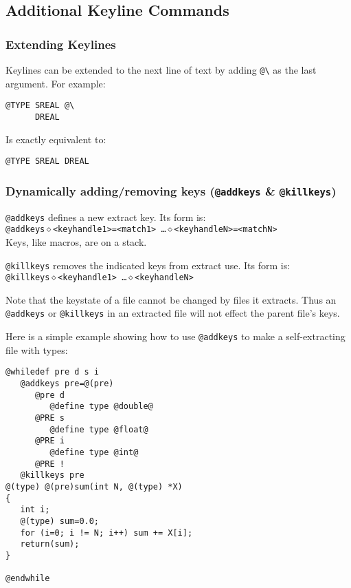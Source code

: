 \subsection{Additional Keyline Commands}
\label{sec-keylines}

\subsubsection{Extending Keylines}

Keylines can be extended to the next line of text by adding \verb+@\+ as the
last argument.  For example:
\begin{verbatim}
@TYPE SREAL @\
      DREAL
\end{verbatim}

Is exactly equivalent to:
\begin{verbatim}
@TYPE SREAL DREAL
\end{verbatim}

\subsubsection{Dynamically adding/removing keys ({\tt @addkeys} \& {\tt @killkeys})}
{\tt @addkeys} defines a new extract key.  Its form is:\\
{\tt @addkeys$\diamond$<keyhandle1>=<match1> \ldots $\diamond$<keyhandleN>=<matchN>}\\
Keys, like macros, are on a stack.

{\tt @killkeys} removes the indicated keys from extract use.  Its form is:\\
{\tt @killkeys$\diamond$<keyhandle1> \ldots $\diamond$<keyhandleN>}

Note that the keystate of a file cannot be changed by files it extracts.  Thus
an {\tt @addkeys} or {\tt @killkeys} in an extracted file will not effect the
parent file's keys.

\noindent
Here is a simple example showing how to use {\tt @addkeys} to make a
self-extracting file with types:
\begin{verbatim}
@whiledef pre d s i
   @addkeys pre=@(pre)
      @pre d
         @define type @double@
      @PRE s
         @define type @float@
      @PRE i
         @define type @int@
      @PRE !
   @killkeys pre
@(type) @(pre)sum(int N, @(type) *X)
{
   int i;
   @(type) sum=0.0;
   for (i=0; i != N; i++) sum += X[i];
   return(sum);
}

@endwhile
\end{verbatim}

